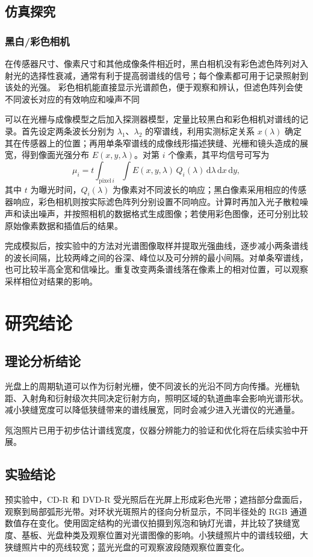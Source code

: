 \documentclass[UTF8,a4paper,12pt]{ctexart}
\begin{document}
\subsection{仿真探究}
\subsubsection{黑白/彩色相机}
在传感器尺寸、像素尺寸和其他成像条件相近时，黑白相机没有彩色滤色阵列对入射光的选择性衰减，通常有利于提高弱谱线的信号；每个像素都可用于记录照射到该处的光强。
彩色相机能直接显示光谱颜色，便于观察和辨认，但滤色阵列会使不同波长对应的有效响应和噪声不同


可以在光栅与成像模型之后加入探测器模型，定量比较黑白和彩色相机对谱线的记录。首先设定两条波长分别为 $\lambda_1$、$\lambda_2$ 的窄谱线，利用实测标定关系 $x(\lambda)$ 确定其在传感器上的位置；再用单条窄谱线的成像线形描述狭缝、光栅和镜头造成的展宽，得到像面光强分布 $E(x,y,\lambda)$。对第 $i$ 个像素，其平均信号可写为
\begin{equation}
  \mu_i=t\int_{\mathrm{pixel}\,i}\!\int E(x,y,\lambda)\,Q_i(\lambda)\,\mathrm{d}\lambda\,\mathrm{d}x\,\mathrm{d}y,
  \label{eq:camera-simulation}
\end{equation}
其中 $t$ 为曝光时间，$Q_i(\lambda)$ 为像素对不同波长的响应；黑白像素采用相应的传感器响应，彩色相机则按实际滤色阵列分别设置不同响应。计算时再加入光子散粒噪声和读出噪声，并按照相机的数据格式生成图像；若使用彩色图像，还可分别比较原始像素数据和插值后的结果。

完成模拟后，按实验中的方法对光谱图像取样并提取光强曲线，逐步减小两条谱线的波长间隔，比较两峰之间的谷深、峰位以及可分辨的最小间隔。对单条窄谱线，也可比较半高全宽和信噪比。重复改变两条谱线落在像素上的相对位置，可以观察采样相位对结果的影响。



\section{研究结论}
\subsection{理论分析结论}
光盘上的周期轨道可以作为衍射光栅，使不同波长的光沿不同方向传播。光栅轨距、入射角和衍射级次共同决定衍射方向，照明区域的轨道曲率会影响光谱形状。减小狭缝宽度可以降低狭缝带来的谱线展宽，同时会减少进入光谱仪的光通量。

氖泡照片已用于初步估计谱线宽度，仪器分辨能力的验证和优化将在后续实验中开展。

\subsection{实验结论}
预实验中，CD-R 和 DVD-R 受光照后在光屏上形成彩色光带；遮挡部分盘面后，观察到局部弧形光带。对环状光斑照片的径向分析显示，不同半径处的 RGB 通道数值存在变化。使用固定结构的光谱仪拍摄到氖泡和钠灯光谱，并比较了狭缝宽度、基板、光盘种类及观察位置对光谱图像的影响。小狭缝照片中的谱线较细，大狭缝照片中的亮线较宽；蓝光光盘的可观察波段随观察位置变化。
\end{document}
